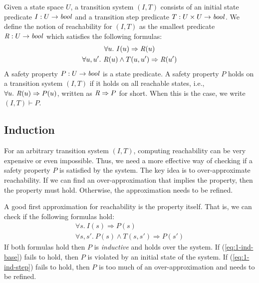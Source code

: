 Given a state space $U$, a transition system $(I,T)$ consists of an
initial state predicate $I : U \to \mathit{bool}$ and a transition step
predicate $T : U \times U \to \mathit{bool}$.
We define the notion of
reachability for $(I, T)$ as the smallest predicate $\mathit{R} : U \to
\mathit{bool}$ which satisfies the following formulas:
\begin{gather*}
  \forall u.~ I(u) \Rightarrow \mathit{R}(u) \\
  \forall u, u'.~ \mathit{R}(u) \land T(u, u') \Rightarrow \mathit{R}(u')
\end{gather*}
A safety property $P : U \to \mathit{bool}$ is a state predicate. A safety
property $P$ holds on a transition system $(I, T)$ if it holds on all
reachable states, i.e., $\forall u.~ \mathit{R}(u) \Rightarrow P(u)$,
written as $\mathit{R} \Rightarrow P$ for short. When this is the case, we
write $(I, T)\vdash P$.

\subsection{Induction}
\label{sec:induction}
For an arbitrary transition system $(I, T)$, computing reachability
can be very expensive or even impossible. Thus, we need a more
effective way of checking if a safety property $P$ is satisfied by the
system. The key idea is to over-approximate reachability. If we can
find an over-approximation that implies the property, then the
property must hold. Otherwise, the approximation needs to be refined.

A good first approximation for reachability is the property itself.
That is, we can check if the following formulas hold:
\begin{gather}
  \forall s.~ I(s) \Rightarrow P(s)
  \label{eq:1-ind-base} \\
  \forall s, s'.~ P(s) \land T(s, s') \Rightarrow P(s')
  \label{eq:1-ind-step}
\end{gather}
If both formulas hold then $P$ is {\em inductive} and holds over the
system. If (\ref{eq:1-ind-base}) fails to hold, then $P$ is violated
by an initial state of the system. If (\ref{eq:1-ind-step}) fails to
hold, then $P$ is too much of an over-approximation and needs to be
refined.

